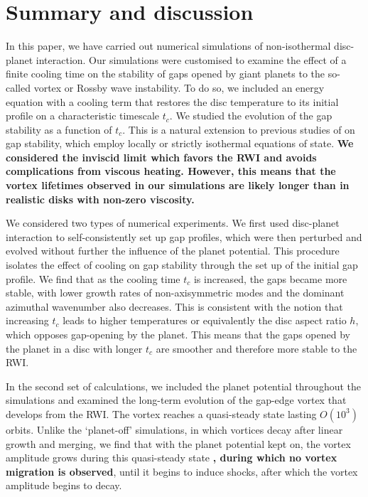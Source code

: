 \section{Summary and discussion}\label{summary}
In this paper, we have carried out numerical simulations of
non-isothermal disc-planet interaction.  
Our simulations were customised to examine the effect of a finite 
cooling time on the stability of gaps  
opened by giant planets to the so-called vortex or Rossby wave
instability. To do so, we  
included an energy equation with a cooling term that restores the 
disc temperature to its initial profile on a characteristic timescale
$t_c$. We studied the evolution of the gap stability as a function of 
$t_c$. This is a natural extension to previous studies of on gap
stability, which employ locally or strictly isothermal equations of
state. {\bf We considered the inviscid limit which favors the RWI
  \citep{li09,fu14} and avoids complications from viscous
  heating. However, this means that the vortex lifetimes observed in
  our simulations are likely longer than in realistic disks with
  non-zero viscosity. }    	

We considered two types of numerical experiments. We first used
disc-planet interaction to self-consistently set up gap profiles,
which were then perturbed and evolved without further the influence of
the planet potential. This procedure isolates the effect of cooling on
gap stability through the set up of the initial gap profile. We find
that as the cooling time $t_c$ is increased, the gaps became more
stable, with lower growth rates of non-axisymmetric modes and the
dominant azimuthal wavenumber also decreases. This is consistent with
the notion that increasing $t_c$ leads to higher temperatures or
equivalently the disc aspect ratio $h$,
which opposes gap-opening by the planet. This means that the gaps
opened by the planet in a disc with longer $t_c$ are smoother and
therefore  more stable to the RWI. %

In the second set of calculations, we included the planet potential
throughout the simulations  and examined the long-term evolution of
the gap-edge vortex that develops from the RWI. The vortex reaches 
a quasi-steady state lasting $O(10^3)$ orbits. Unlike the `planet-off'
simulations, in which vortices decay after linear growth and merging,
we find that with the planet potential kept on, the vortex amplitude
grows during this quasi-steady state {\bf, during which no vortex migration is
  observed}, until it begins to induce
shocks, after which the vortex amplitude begins to decay.   

